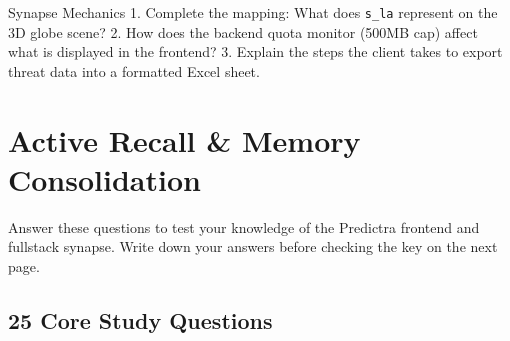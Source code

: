 \documentclass[11pt,a4paper]{report}
\begin{document}
\begin{activerecall}{Synapse Mechanics}
  1. Complete the mapping: What does \texttt{s\_la} represent on the 3D globe scene?
  2. How does the backend quota monitor (500MB cap) affect what is displayed in the frontend?
  3. Explain the steps the client takes to export threat data into a formatted Excel sheet.
\end{activerecall}

\newpage

\chapter{Active Recall \& Memory Consolidation}

Answer these questions to test your knowledge of the Predictra frontend and fullstack synapse. Write down your answers before checking the key on the next page.

\section{25 Core Study Questions}
\end{document}
